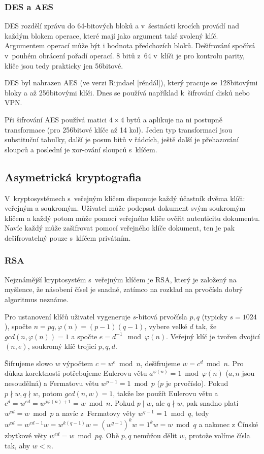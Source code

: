 \subsubsection{DES a AES}

DES rozdělí zprávu do 64-bitových bloků
a v~šestnácti krocích provádí nad každým blokem operace, které mají jako
argument také zvolený klíč. Argumentem operací může být i hodnota
předchozích bloků. Dešifrování spočívá v~pouhém obrácení pořadí operací.
8 bitů z~64 v~klíči je pro kontrolu parity, klíče jsou tedy prakticky
jen 56bitové.

DES byl nahrazen AES (ve verzi Rijndael [réndál]), který pracuje se
128bitovými bloky a až 256bitovými klíči. Dnes se používá například
k~šifrování disků nebo VPN.

Při šifrování AES používá matici $4 \times 4$ bytů a aplikuje na ni
postupně transformace (pro 256bitové klíče až 14 kol).
Jeden typ transformací jsou substituční tabulky,
další je posun bitů v řádcích,
ještě další je přehazování sloupců
a poslední je xor-ování sloupců s~klíčem.

\subsection{Asymetrická kryptografia}

V~kryptosystémech s~veřejným klíčem disponuje každý účastník dvěma
klíči: veřejným a soukromým. Uživatel může podepsat dokument svým
soukromým klíčem a každý potom může pomocí veřejného klíče ověřit
autenticitu dokumentu. Navíc každý může zašifrovat pomocí veřejného
klíče dokument, ten je pak dešifrovatelný pouze s~klíčem privátním.

\subsubsection{RSA}

Nejznámější kryptosystém s~veřejným klíčem je RSA, který je založený na
myšlence, že násobení čísel je snadné, zatímco na rozklad na prvočísla
dobrý algoritmus neznáme.

Pro ustanovení klíčů uživatel vygeneruje $s$-bitová prvočísla $p,q$
(typicky $s = 1024$), spočte $n = pq, \varphi(n) = (p-1)(q-1)$,
vybere velké $d$ tak, že $gcd(n, \varphi(n)) = 1$
a spočte $e = d^{-1} \mod \varphi(n)$. Veřejný klíč je tvořen dvojicí
$(n, e)$, soukromý klíč trojicí $p,q,d$.

Šifrujeme slowo $w$ výpočtem $c = w^e \bmod n$,
dešifrujeme $w = c^d \bmod n$.
Pro důkaz korektnosti potřebujeme Eulerovu větu $a^{\varphi(n)} = 1
\bmod \varphi(n)$ ($a,n$ jsou nesoudělná)
a Fermatovu větu $w^{p-1} = 1 \bmod p$ ($p$ je prvočíslo).
Pokud $p \nmid w, q \nmid w$, potom $gcd(n,w) = 1$, takže lze použít
Eulerovu větu a $c^d = w^{ed} = w^{j \varphi(n) + 1} = w \bmod n$.
Pokud $p \mid w$, ale $q \nmid w$,
pak snadno platí $w^{ed} = w \bmod p$
a navíc z~Fermatovy věty $w^{q-1} = 1 \bmod q$,
tedy
$w^{ed} = w^{ed - 1} w = w^{k(q-1)} w = (w^{q-1})^k w = 1^kw = w \bmod q$
a nakonec z Čínské zbytkové věty
$w^{ed} = w \bmod pq$.
Obě $p,q$ nemůžou dělit $w$, protože volíme čísla tak, aby $w < n$.

